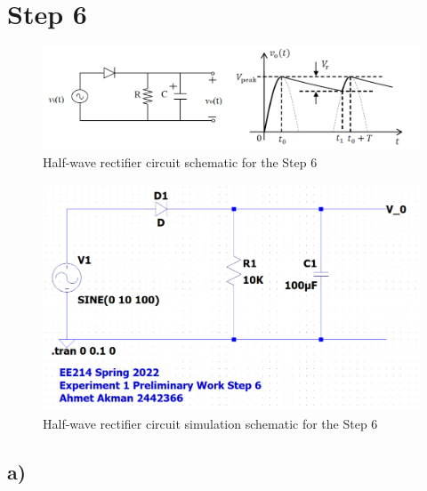 \documentclass[letterpaper,12pt]{article}
\begin{document}
\section{Step 6}

\begin{figure}[H]
    \centering
   \includegraphics[width=1\textwidth]{6_1.png}
   \caption{Half-wave rectifier circuit schematic for the Step 6}
\end{figure} 


\begin{figure}[H]
    \centering
   \includegraphics[width=1\textwidth]{6SCH.png}
   \caption{Half-wave rectifier circuit simulation schematic for the Step 6}
\end{figure} 



\subsection{a)}
\end{document}

